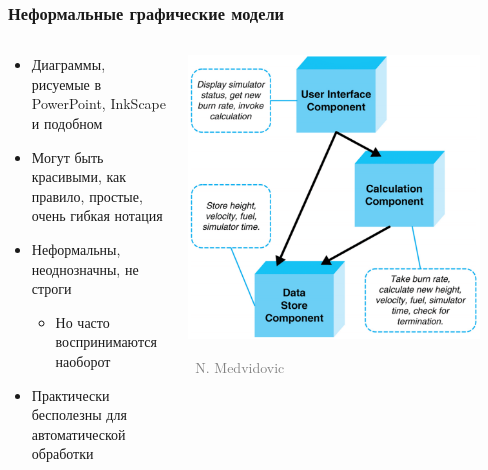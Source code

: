 \documentclass[xetex,mathserif,serif]{beamer}
\newcommand{\attribution}[1] {
	\vspace{-5mm}\begin{flushright}\begin{scriptsize}\textcolor{gray}{\textcopyright\, #1}\end{scriptsize}\end{flushright}
}
\begin{document}
	\begin{frame}
		\frametitle{Неформальные графические модели}
		\begin{columns}
			\begin{column}{0.5\textwidth}
				\begin{itemize}
					\item Диаграммы, рисуемые в PowerPoint, InkScape и подобном
					\item Могут быть красивыми, как правило, простые, очень гибкая нотация
					\item Неформальны, неоднозначны, не строги
					\begin{itemize}
						\item Но часто воспринимаются наоборот
					\end{itemize}
					\item Практически бесполезны для автоматической обработки
				\end{itemize}
			\end{column}
			\begin{column}{0.5\textwidth}
				\begin{center}
					\includegraphics[width=0.9\textwidth]{informalModel.png}
					\attribution{N. Medvidovic}
				\end{center}
			\end{column}
		\end{columns}
	\end{frame}
\end{document}
